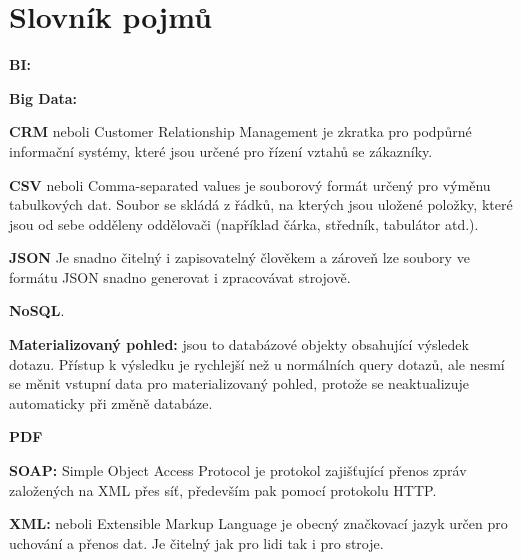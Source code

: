 \documentclass[czech,BP]{thesiskiv}
\begin{document}
\chapter{Slovník pojmů}
\label{Slovník}



\hspace{0,5cm} \textbf{BI:}  \cite{BI}

\textbf{Big Data:}  \cite{BigData}

\textbf{CRM} neboli Customer Relationship Management je zkratka pro podpůrné informační systémy, které jsou určené pro řízení vztahů se zákazníky.

\textbf{CSV} neboli Comma-separated values je souborový formát určený pro výměnu tabulkových dat. Soubor se skládá z řádků, na kterých jsou uložené položky, které jsou od sebe odděleny oddělovači (například čárka, středník, tabulátor atd.).

\textbf{JSON}  Je snadno čitelný i zapisovatelný člověkem a zároveň lze soubory ve formátu JSON snadno generovat i zpracovávat strojově.\cite{JSON}

\textbf{NoSQL}.\cite{NoSQL}

\textbf{Materializovaný pohled:} jsou to databázové objekty obsahující výsledek dotazu. Přístup k výsledku je rychlejší než u normálních query dotazů, ale nesmí se měnit vstupní data pro materializovaný pohled, protože se neaktualizuje automaticky při změně databáze.

\textbf{PDF}  \citealp{PDF}

\textbf{SOAP:} Simple Object Access Protocol je protokol zajišťující přenos zpráv založených na XML přes síť, především pak pomocí protokolu HTTP.

\textbf{XML:} neboli Extensible Markup Language je obecný značkovací jazyk určen pro uchování a přenos dat. Je čitelný jak pro lidi tak i pro stroje.


{\raggedright\small

}
\end{document}
